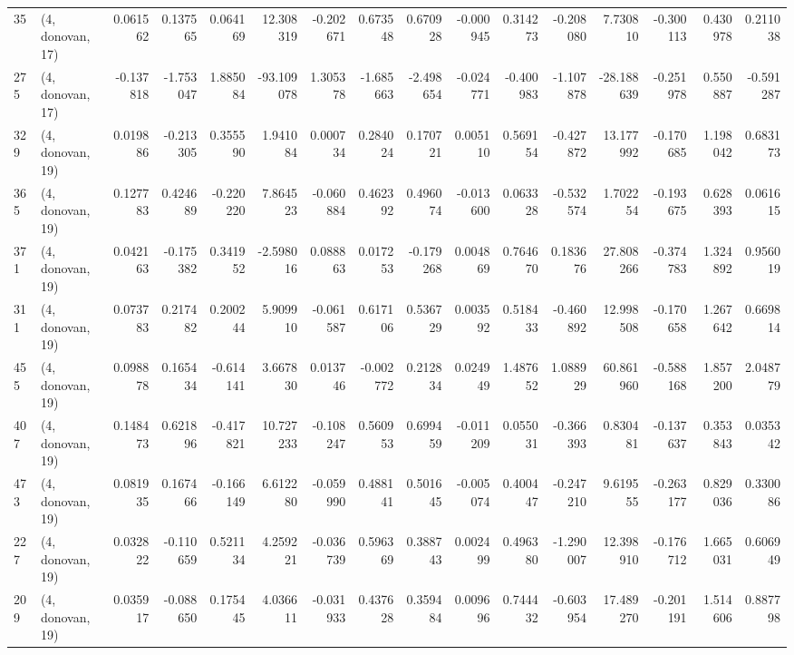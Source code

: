 \begin{tabular}{llrrrrrrrrrrrrrr}
35  &  (4, donovan, 17) &   0.061562 &  0.137565 &  0.064169 &    12.308319 &  -0.202671 &   0.673548 &   0.670928 & -0.000945 &  0.314273 & -0.208080 &    7.730810 & -0.300113 &  0.430978 &  0.211038 \\
275 &  (4, donovan, 17) &  -0.137818 & -1.753047 &  1.885084 &   -93.109078 &   1.305378 &  -1.685663 &  -2.498654 & -0.024771 & -0.400983 & -1.107878 &  -28.188639 & -0.251978 &  0.550887 & -0.591287 \\
329 &  (4, donovan, 19) &   0.019886 & -0.213305 &  0.355590 &     1.941084 &   0.000734 &   0.284024 &   0.170721 &  0.005110 &  0.569154 & -0.427872 &   13.177992 & -0.170685 &  1.198042 &  0.683173 \\
365 &  (4, donovan, 19) &   0.127783 &  0.424689 & -0.220220 &     7.864523 &  -0.060884 &   0.462392 &   0.496074 & -0.013600 &  0.063328 & -0.532574 &    1.702254 & -0.193675 &  0.628393 &  0.061615 \\
371 &  (4, donovan, 19) &   0.042163 & -0.175382 &  0.341952 &    -2.598016 &   0.088863 &   0.017253 &  -0.179268 &  0.004869 &  0.764670 &  0.183676 &   27.808266 & -0.374783 &  1.324892 &  0.956019 \\
311 &  (4, donovan, 19) &   0.073783 &  0.217482 &  0.200244 &     5.909910 &  -0.061587 &   0.617106 &   0.536729 &  0.003592 &  0.518433 & -0.460892 &   12.998508 & -0.170658 &  1.267642 &  0.669814 \\
455 &  (4, donovan, 19) &   0.098878 &  0.165434 & -0.614141 &     3.667830 &   0.013746 &  -0.002772 &   0.212834 &  0.024949 &  1.487652 &  1.088929 &   60.861960 & -0.588168 &  1.857200 &  2.048779 \\
407 &  (4, donovan, 19) &   0.148473 &  0.621896 & -0.417821 &    10.727233 &  -0.108247 &   0.560953 &   0.699459 & -0.011209 &  0.055031 & -0.366393 &    0.830481 & -0.137637 &  0.353843 &  0.035342 \\
473 &  (4, donovan, 19) &   0.081935 &  0.167466 & -0.166149 &     6.612280 &  -0.059990 &   0.488141 &   0.501645 & -0.005074 &  0.400447 & -0.247210 &    9.619555 & -0.263177 &  0.829036 &  0.330086 \\
227 &  (4, donovan, 19) &   0.032822 & -0.110659 &  0.521134 &     4.259221 &  -0.036739 &   0.596369 &   0.388743 &  0.002499 &  0.496380 & -1.290007 &   12.398910 & -0.176712 &  1.665031 &  0.606949 \\
209 &  (4, donovan, 19) &   0.035917 & -0.088650 &  0.175445 &     4.036611 &  -0.031933 &   0.437628 &   0.359484 &  0.009696 &  0.744432 & -0.603954 &   17.489270 & -0.201191 &  1.514606 &  0.887798 \\

\end{tabular}
